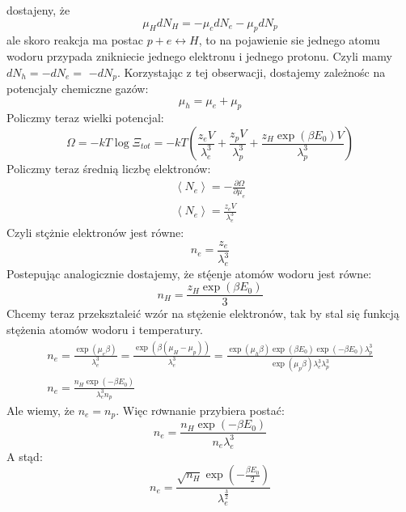 \documentclass[12pt,a4paper]{article}
\begin{document}
dostajeny, że
$$
\mu_{H} d N_{H}=-\mu_{c} d N_{e}-\mu_{p} d N_{p}
$$
ale skoro reakcja ma postac $p+e \leftrightarrow H$, to na pojawienie sie jednego atomu wodoru przypada znikniecie jednego elektronu i jednego protonu. Czyli mamy $d N_{h}=-d N_{e}=$ $-d N_{p}$. Korzystając z tej obserwacji, dostajemy zależnośc na potencjaly chemiczne gazów:
$$
\mu_{h}=\mu_{e}+\mu_{p}
$$
Policzmy teraz wielki potencjal:
$$
\Omega=-k T \log \Xi_{t o t}=-k T\left(\frac{z_{e} V}{\lambda_{e}^{3}}+\frac{z_{p} V}{\lambda_{p}^{3}}+\frac{z_{H} \exp \left(\beta E_{0}\right) V}{\lambda_{p}^{3}}\right)
$$
Policzmy teraz średnią liczbę elektronów:
$$
\begin{array}{r}
\left\langle N_{e}\right\rangle=-\frac{\partial \Omega}{\partial \mu_{e}} \\
\left\langle N_{e}\right\rangle=\frac{z_{e} V}{\lambda_{e}^{3}}
\end{array}
$$
Czyli stçżnie elektronów jest równe:
$$
n_{e}=\frac{z_{e}}{\lambda_{e}^{3}}
$$
Postepując analogicznie dostajemy, że stę́enje atomów wodoru jest równe:
$$
n_{H}=\frac{z_{H} \exp \left(\beta E_{0}\right)}{3}
$$
Chcemy teraz przeksztaleić wzór na stężenie elektronów, tak by stal się funkcją stężenia atomów wodoru i temperatury.
$$
\begin{gathered}
n_{e}=\frac{\exp \left(\mu_{e} \beta\right)}{\lambda_{e}^{3}}=\frac{\exp \left(\beta\left(\mu_{H}-\mu_{p}\right)\right)}{\lambda_{e}^{3}}=\frac{\exp \left(\mu_{h} \beta\right) \exp \left(\beta E_{0}\right) \exp \left(-\beta E_{0}\right) \lambda_{p}^{3}}{\exp \left(\mu_{p} \beta\right) \lambda_{e}^{3} \lambda_{p}^{3}} \\
n_{e}=\frac{n_{H} \exp \left(-\beta E_{0}\right)}{\lambda_{e}^{3} n_{p}}
\end{gathered}
$$
Ale wiemy, że $n_{e}=n_{p}$. Więc rơwnanie przybiera postać:
$$
n_{e}=\frac{n_{H} \exp \left(-\beta E_{0}\right)}{n_{e} \lambda_{e}^{3}}
$$
A stąd:
$$
n_{e}=\frac{\sqrt{n_{H}} \exp \left(-\frac{\beta E_{0}}{2}\right)}{\lambda_{e}^{\frac{3}{2}}}
$$
\end{document}
